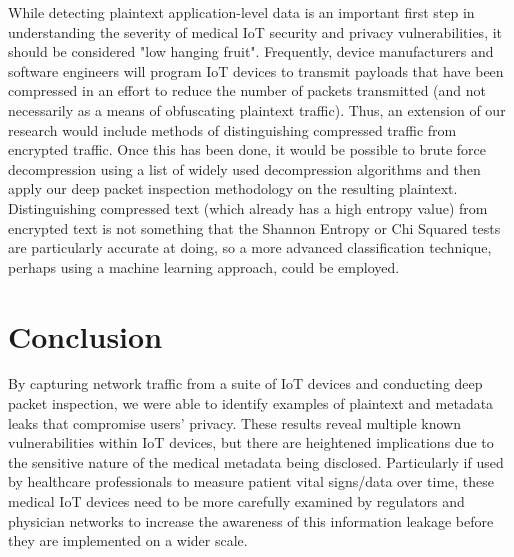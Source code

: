 While detecting plaintext application-level data is an important first step in understanding
the severity of medical IoT security and privacy vulnerabilities, it should be considered "low hanging fruit". Frequently, device manufacturers and software engineers will program IoT devices to transmit payloads that have been compressed in an effort to reduce the number of packets transmitted (and not necessarily as a means of obfuscating plaintext traffic). Thus, an extension of our research would include methods of distinguishing compressed traffic from encrypted traffic. Once this has been done, it would be possible to brute force decompression using a list of widely used decompression algorithms and then apply our deep packet inspection methodology on the resulting plaintext. Distinguishing compressed text (which already has a high entropy value) from encrypted text is not something that the Shannon Entropy or Chi Squared tests are particularly accurate at doing, so a more advanced classification technique, perhaps using a machine learning approach, could be employed. 

\section{Conclusion}

By capturing network traffic from a suite of IoT devices and conducting deep packet inspection, we were able to identify examples of plaintext and metadata leaks that compromise users' privacy. These results reveal multiple known vulnerabilities within IoT devices, but there are heightened implications due to the sensitive nature of the medical metadata being disclosed. Particularly if used by healthcare professionals to measure patient vital signs/data over time, these medical IoT devices need to be more carefully examined by regulators and physician networks to increase the awareness of this information leakage before they are implemented on a wider scale. 

